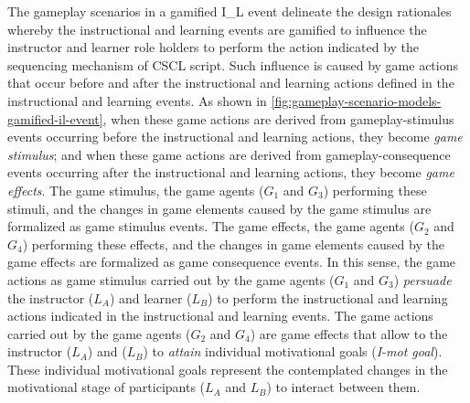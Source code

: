 The gameplay scenarios in a gamified I\_L event delineate the design rationales whereby the instructional and learning events are gamified to influence the instructor and learner role holders to perform the action indicated by the sequencing mechanism of CSCL script.
Such influence is caused by game actions that occur before and after the instructional and learning actions defined in the instructional and learning events.
As shown in \autoref{fig:gameplay-scenario-models-gamified-il-event}, when these game actions are derived from gameplay-stimulus events occurring before the instructional and learning actions, they become \emph{game stimulus}; and when these game actions are derived from gameplay-consequence events occurring after the instructional and learning actions, they become \emph{game effects}.
The game stimulus, the game agents ($G_{1}$ and $G_{3}$) performing these stimuli, and the changes in game elements caused by the game stimulus are formalized as game stimulus events.
The game effects, the game agents ($G_{2}$ and $G_{4}$) performing these effects, and the changes in game elements caused by the game effects are formalized as game consequence events.
In this sense, the game actions as game stimulus carried out by the game agents ($G_{1}$ and $G_{3}$) \emph{persuade} the instructor ($L_{A}$) and learner ($L_{B}$) to perform the instructional and learning actions indicated in the instructional and learning events.
The game actions carried out by the game agents ($G_{2}$ and $G_{4}$) are game effects that allow to the instructor ($L_{A}$) and ($L_{B}$) to \emph{attain} individual motivational goals (\emph{I-mot goal}).
These individual motivational goals represent the contemplated changes in the motivational stage of participants ($L_{A}$ and $L_{B}$) to interact between them.

